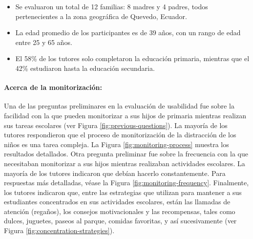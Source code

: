 \begin{itemize}
\item Se evaluaron un total de 12 familias: 8 madres y 4 padres, todos pertenecientes a la zona geográfica de Quevedo, Ecuador.
\item La edad promedio de los participantes es de 39 años, con un rango de edad entre 25 y 65 años.
\item El 58\% de los tutores solo completaron la educación primaria, mientras que el 42\% estudiaron hasta la educación secundaria.
\end{itemize}

\paragraph{\textbf{Acerca de la monitorización:}}
Una de las preguntas preliminares en la evaluación de usabilidad fue sobre la facilidad con la que pueden monitorizar a sus hijos de primaria mientras realizan sus tareas escolares (ver Figura \ref{fig:previous-questions}). La mayoría de los tutores respondieron que el proceso de monitorización de la distracción de los niños es una tarea compleja. La Figura \ref{fig:monitoring-process} muestra los resultados detallados. Otra pregunta preliminar fue sobre la frecuencia con la que necesitaban monitorizar a sus hijos mientras realizaban actividades escolares. La mayoría de los tutores indicaron que debían hacerlo constantemente. Para respuestas más detalladas, véase la Figura \ref{fig:monitoring-frequency}. Finalmente, los tutores indicaron que, entre las estrategias que utilizan para mantener a sus estudiantes concentrados en sus actividades escolares, están las llamadas de atención (regaños), los consejos motivacionales y las recompensas, tales como dulces, juguetes, paseos al parque, comidas favoritas, y así sucesivamente (ver Figura \ref{fig:concentration-strategies}).

